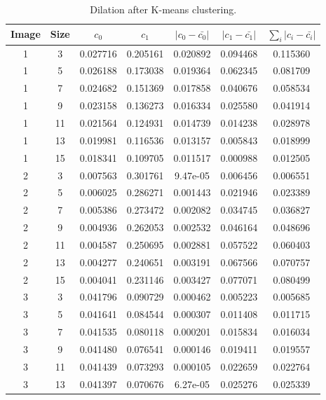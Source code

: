 \begin{longtable}{|c|c|c|c|c|c|c|}
	\caption{Dilation after K-means clustering.} \label{tab:dilatekmeans}\\
	\hline
	Image & Size & $c_0$ & $c_1$ & $|c_0-\bar{c_0}|$ & $|c_1-\bar{c_1}|$ & $\sum_i |c_i-\bar{c_i}|$ \\ 
	\hline 1 &	3 &	0.027716 &	0.205161 &	0.020892 &	0.094468 &	0.115360 \\
	\hline 1 &	5 &	0.026188 &	0.173038 &	0.019364 &	0.062345 &	0.081709 \\
	\hline 1 &	7 &	0.024682 &	0.151369 &	0.017858 &	0.040676 &	0.058534 \\
	\hline 1 &	9 &	0.023158 &	0.136273 &	0.016334 &	0.025580 &	0.041914 \\
	\hline 1 &	11 &	0.021564 &	0.124931 &	0.014739 &	0.014238 &	0.028978 \\
	\hline 1 &	13 &	0.019981 &	0.116536 &	0.013157 &	0.005843 &	0.018999 \\
	\hline \rowcolor{closest} 1 &	15 &	0.018341 &	0.109705 &	0.011517 &	0.000988 &	0.012505 \\
	\hline \rowcolor{closest} 2 &	3 &	0.007563 &	0.301761 &	9.47e-05 &	0.006456 &	0.006551 \\
	\hline 2 &	5 &	0.006025 &	0.286271 &	0.001443 &	0.021946 &	0.023389 \\
	\hline 2 &	7 &	0.005386 &	0.273472 &	0.002082 &	0.034745 &	0.036827 \\
	\hline 2 &	9 &	0.004936 &	0.262053 &	0.002532 &	0.046164 &	0.048696 \\
	\hline 2 &	11 &	0.004587 &	0.250695 &	0.002881 &	0.057522 &	0.060403 \\
	\hline 2 &	13 &	0.004277 &	0.240651 &	0.003191 &	0.067566 &	0.070757 \\
	\hline 2 &	15 &	0.004041 &	0.231146 &	0.003427 &	0.077071 &	0.080499 \\
	\hline \rowcolor{closest} 3 &	3 &	0.041796 &	0.090729 &	0.000462 &	0.005223 &	0.005685 \\
	\hline 3 &	5 &	0.041641 &	0.084544 &	0.000307 &	0.011408 &	0.011715 \\
	\hline 3 &	7 &	0.041535 &	0.080118 &	0.000201 &	0.015834 &	0.016034 \\
	\hline 3 &	9 &	0.041480 &	0.076541 &	0.000146 &	0.019411 &	0.019557 \\
	\hline 3 &	11 &	0.041439 &	0.073293 &	0.000105 &	0.022659 &	0.022764 \\
	\hline 3 &	13 &	0.041397 &	0.070676 &	6.27e-05 &	0.025276 &	0.025339 \\

\end{longtable}
